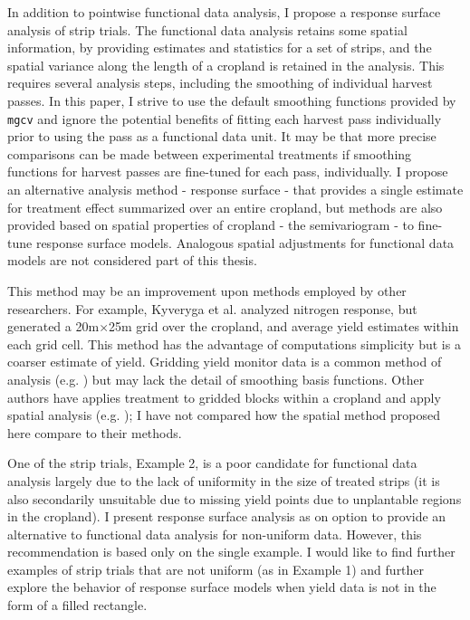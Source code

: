 \documentclass[phdcss]{SDSUThesis}
\begin{document}
In addition to pointwise functional data analysis, I propose a response surface analysis of strip trials. The functional data analysis retains some spatial information, by providing estimates and statistics for a set of strips, and the spatial variance along the length of a cropland is retained in the analysis. This requires several analysis steps, including the smoothing of individual harvest passes. In this paper, I strive to use the default smoothing functions provided by \texttt{mgcv} and ignore the potential benefits of fitting each harvest pass individually prior to using the pass as a functional data unit. It may be that more precise comparisons can be made between experimental treatments if smoothing functions for harvest passes are fine-tuned for each pass, individually. I propose an alternative analysis method - response surface - that provides a single estimate for treatment effect summarized over an entire cropland, but methods are also provided based on spatial properties of cropland - the semivariogram - to fine-tune response surface models. Analogous spatial adjustments for functional data models are not considered part of this thesis. 

This method may be an improvement upon methods employed by other researchers. For example, Kyveryga et al. \cite{kyveryga-05-2011} analyzed nitrogen response, but generated a 20m$\times$25m grid over the cropland, and average yield estimates within each grid cell. This method has the advantage of computations simplicity but is a coarser estimate of yield. Gridding yield monitor data is a common method of analysis (e.g. \cite{scharf-2005, kleinjan-2007}) but may lack the detail of smoothing basis functions. Other authors have applies treatment to gridded blocks within a cropland and apply spatial analysis (e.g. \cite{trevisan-2021}); I have not compared how the spatial method proposed here compare to their methods.

One of the strip trials, Example 2, is a poor candidate for functional data analysis largely due to the lack of uniformity in the size of treated strips (it is also secondarily unsuitable due to missing yield points due to unplantable regions in the cropland). I present response surface analysis as on option to provide an alternative to functional data analysis for non-uniform data. However, this recommendation is based only on the single example. I would like to find further examples of strip trials that are not uniform (as in Example 1) and further explore the behavior of response surface models when yield data is not in the form of a filled rectangle.
\end{document}
